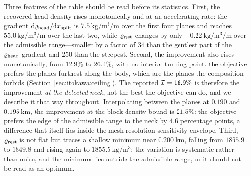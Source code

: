 Three features of the table should be read before its statistics. First,
the recovered head density rises monotonically and at an accelerating
rate: the gradient $\mathrm{d}\varrho_{\mathrm{head}}/\mathrm{d}x_{\mathrm{split}}$ is
$\SI{7.5}{\kilo\gram\per\cubic\metre\per\metre}$ over the first four
planes and reaches
$\SI{55.0}{\kilo\gram\per\cubic\metre\per\metre}$ over the last two,
while $\varrho_{\mathrm{rest}}$ changes by only
$-\SI{0.22}{\kilo\gram\per\cubic\metre\per\metre}$ over the admissible
range---smaller by a factor of $34$ than the gentlest part of the
$\varrho_{\mathrm{head}}$ gradient and $250$ than the steepest. Second, the improvement
also rises monotonically, from $12.9\%$ to $26.4\%$, with no interior
turning point: the objective prefers the planes furthest along the body,
which are the planes the composition forbids
(Section~\ref{sec:itokawa:ceiling}). The reported $\mathcal{I} = 16.9\%$ is
therefore the improvement \emph{at the detected neck}, not the best the
objective can do, and we describe it that way throughout. Interpolating
between the planes at $0.190$ and $\SI{0.195}{\kilo\metre}$, the improvement
at the block-density bound is $21.5\%$: the objective prefers the edge of the
admissible range to the neck by $4.6$ percentage points, a difference that
itself lies inside the mesh-resolution sensitivity envelope. Third,
$\varrho_{\mathrm{rest}}$ is not flat but traces a shallow minimum near
$\SI{0.200}{\kilo\metre}$, falling from $1865.9$ to $1849.8$ and rising
again to $\SI{1855.5}{\kilo\gram\per\cubic\metre}$; the variation is
systematic rather than noise, and the minimum lies outside the admissible
range, so it should not be read as an optimum.

